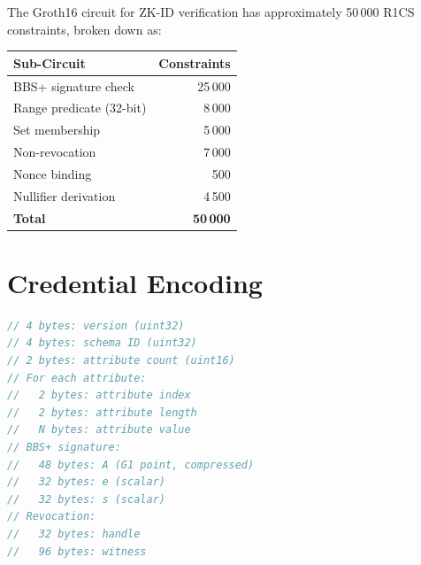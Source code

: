 \documentclass[11pt,a4paper]{article}
\begin{document}
The Groth16 circuit for ZK-ID verification has approximately 50\,000
R1CS constraints, broken down as:

\begin{table}[h]
\centering
\begin{tabular}{@{}lr@{}}
\toprule
\textbf{Sub-Circuit} & \textbf{Constraints} \\
\midrule
BBS+ signature check     & 25\,000 \\
Range predicate (32-bit) & 8\,000 \\
Set membership           & 5\,000 \\
Non-revocation           & 7\,000 \\
Nonce binding            & 500 \\
Nullifier derivation     & 4\,500 \\
\midrule
\textbf{Total}           & \textbf{50\,000} \\
\bottomrule
\end{tabular}
\end{table}

\section{Credential Encoding}
\label{app:encoding}

\begin{lstlisting}[language=Go,caption={Credential Binary Format}]
// 4 bytes: version (uint32)
// 4 bytes: schema ID (uint32)
// 2 bytes: attribute count (uint16)
// For each attribute:
//   2 bytes: attribute index
//   2 bytes: attribute length
//   N bytes: attribute value
// BBS+ signature:
//   48 bytes: A (G1 point, compressed)
//   32 bytes: e (scalar)
//   32 bytes: s (scalar)
// Revocation:
//   32 bytes: handle
//   96 bytes: witness
\end{lstlisting}
\end{document}
